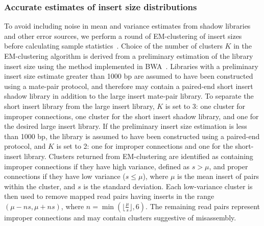 \documentclass{bioinfo}
\begin{document}
\subsubsection{Accurate estimates of insert size distributions}

To avoid including noise in mean and variance estimates from shadow libraries and other error sources, 
we perform a round of EM-clustering of insert sizes before calculating sample statistics~\citep{GuptaChen2010}. Choice of 
the number of clusters $K$ in
the EM-clustering algorithm is derived from a preliminary estimation of the library insert size using the method implemented in
BWA~\citep{bwa}. Libraries with a preliminary
insert size estimate greater than 1000 bp are assumed to have been constructed using a mate-pair protocol, and therefore
may contain a paired-end short insert shadow library in addition to the large insert mate-pair library. To separate the short insert library
from the large insert library, $K$ is set to 3: one cluster for improper connections, one cluster for the short insert
shadow library, and one for the desired large insert library. If the preliminary insert size estimation is less than 1000 bp, the library
is assumed to have been constructed using a paired-end protocol, and $K$ is set to 2: one for improper connections
and one for the short-insert library. Clusters returned from EM-clustering are identified as containing improper connections if 
they have high variance, defined as $s > \mu$, and proper connections if they have low variance ($s \le \mu$), where $\mu$ is the mean insert of pairs within
the cluster, and $s$ is the standard deviation. Each low-variance cluster is then used to remove mapped read pairs 
having inserts in the range $(\mu-ns,\mu+ns)$, where $n = \min(\lfloor\frac{\mu}{s}\rfloor, 6)$.  The remaining read
pairs represent improper connections and may contain clusters suggestive of misassembly.
\end{document}
